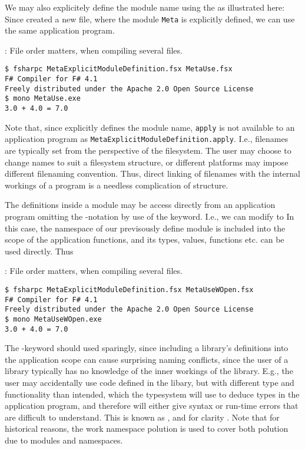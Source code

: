 We may also explicitely define the module name using the  as illustrated here:
%
%
Since created a new file, where the module \lstinline{Meta} is explicitly defined, we can use the same application program.
\begin{codeNOutput}{: File order matters, when compiling several files.}
\begin{lstlisting}[language=console,escapechar=§]
$ fsharpc MetaExplicitModuleDefinition.fsx MetaUse.fsx
F# Compiler for F# 4.1
Freely distributed under the Apache 2.0 Open Source License
$ mono MetaUse.exe 
3.0 + 4.0 = 7.0
\end{lstlisting}
\end{codeNOutput}
Note that, since   explicitly defines the module name, \lstinline{apply} is not available to an application program as \lstinline{MetaExplicitModuleDefinition.apply}.  I.e., filenames are typically set from the perspective of the filesystem.  The user may choose to change names to suit a filesystem structure, or different platforms may impose different filenaming convention. Thus, direct linking of filenames with the internal workings of a program is a needless complication of structure.

The definitions inside a module may be access directly from an application program omitting the -notation by use of the  keyword. I.e., we can modify  to
%
%
In this case, the namespace of our previsously define module is included into the scope of the application functions, and its types, values, functions etc. can be used directly. Thus
\begin{codeNOutput}{: File order matters, when compiling several files.}
\begin{lstlisting}[language=console,escapechar=§]
$ fsharpc MetaExplicitModuleDefinition.fsx MetaUseWOpen.fsx
F# Compiler for F# 4.1
Freely distributed under the Apache 2.0 Open Source License
$ mono MetaUseWOpen.exe 
3.0 + 4.0 = 7.0
\end{lstlisting}
\end{codeNOutput}
The -keyword should used sparingly, since including a library's definitions into the application scope can cause surprising naming conflicts, since the user of a library typically has no knowledge of the inner workings of the library. E.g., the user may accidentally use code defined in the libary, but with different type and functionality than intended, which the typesystem will use to deduce types in the application program, and therefore will either give syntax or run-time errors that are difficult to understand.  This is known as , and for clarity . Note that for historical reasons, the work namespace polution is used to cover both polution due to modules and namespaces.

